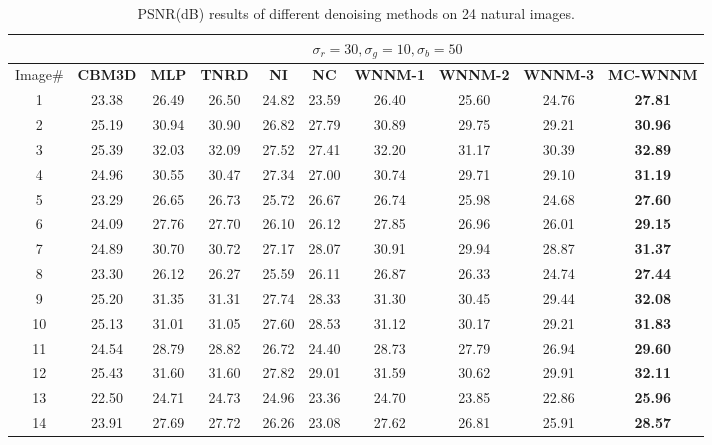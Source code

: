 \documentclass[10pt,onecolumn,letterpaper]{article}
\begin{document}
\begin{table}
\vspace{-1mm}
\caption{PSNR(dB) results of different denoising methods on 24 natural images.}
\label{t2}
\label{taba}
\begin{center}
\renewcommand\arraystretch{1.0}
\footnotesize
\begin{tabular}{|c||c|c|c|c|c|c|c|c|c|}
\hline
&\multicolumn{9}{c|}{ $\sigma_{r} = 30, \sigma_{g} = 10, \sigma_{b} = 50$}
\\
\hline
\hline
Image\#
&
\textbf{CBM3D}
&
\textbf{MLP}
&
\textbf{TNRD}
&
\textbf{NI}
&
\textbf{NC}
&
\textbf{WNNM-1}
&
\textbf{WNNM-2}
&
\textbf{WNNM-3}
&
\textbf{MC-WNNM}
\\
\hline
1 & 23.38 & 26.49 & 26.50 & 24.82 & 23.59 & 26.40 & 25.60 & 24.76 & \textbf{27.81}
\\
\hline
2 & 25.19 & 30.94 & 30.90 & 26.82 & 27.79 & 30.89 & 29.75 & 29.21 & \textbf{30.96}
\\
\hline
3 & 25.39 & 32.03 & 32.09 & 27.52 & 27.41 & 32.20 & 31.17 & 30.39 & \textbf{32.89}
\\
\hline 
4 & 24.96 & 30.55 & 30.47 & 27.34 & 27.00 & 30.74 & 29.71 & 29.10 & \textbf{31.19} 
\\
\hline
5 & 23.29 & 26.65 & 26.73 & 25.72 & 26.67 & 26.74 & 25.98 & 24.68 & \textbf{27.60}
\\
\hline
6 & 24.09 & 27.76 & 27.70 & 26.10 & 26.12 & 27.85 & 26.96 & 26.01 & \textbf{29.15}
\\
\hline
7 & 24.89 & 30.70 & 30.72 & 27.17 & 28.07 & 30.91 & 29.94 & 28.87 & \textbf{31.37} 
\\
\hline
8 & 23.30 & 26.12 & 26.27 & 25.59 & 26.11 & 26.87 & 26.33 & 24.74 & \textbf{27.44}
\\
\hline
9 & 25.20 & 31.35 & 31.31 & 27.74 & 28.33 & 31.30 & 30.45 & 29.44 & \textbf{32.08}
\\
\hline
10 & 25.13 & 31.01 & 31.05 & 27.60 & 28.53 & 31.12 & 30.17 & 29.21 & \textbf{31.83}
\\
\hline
11 & 24.54 & 28.79 & 28.82 & 26.72 & 24.40 & 28.73 & 27.79 & 26.94 & \textbf{29.60}
\\
\hline
12 & 25.43 & 31.60 & 31.60 & 27.82 & 29.01 & 31.59 & 30.62 & 29.91 & \textbf{32.11}
\\
\hline
13 & 22.50 & 24.71 & 24.73 & 24.96 & 23.36 & 24.70 & 23.85 & 22.86 & \textbf{25.96}
\\
\hline
14 & 23.91 & 27.69 & 27.72 & 26.26 & 23.08 & 27.62 & 26.81 & 25.91 & \textbf{28.57}
\\

\end{tabular}
\end{center}
\end{table}
\end{document}
